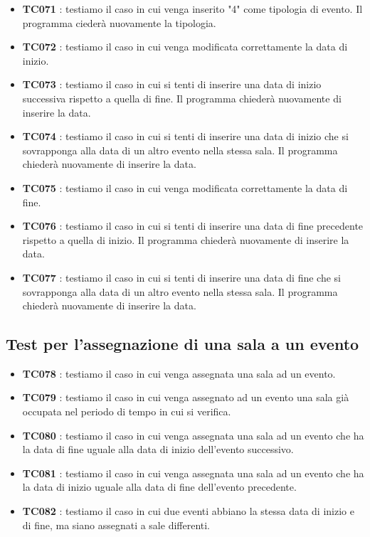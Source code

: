 \documentclass[11pt]{scrartcl} %
\begin{document}
\begin{itemize}
	\item \textbf{TC071} : testiamo il caso in cui venga inserito "4"  come tipologia di evento. Il programma ciederà nuovamente la tipologia.

	\item \textbf{TC072} : testiamo il caso in cui venga modificata correttamente la data di inizio.

	\item \textbf{TC073} : testiamo il caso in cui si tenti di inserire una data di inizio successiva rispetto a quella di fine. Il programma chiederà nuovamente di inserire la data.

	\item \textbf{TC074} : testiamo il caso in cui si tenti di inserire una data di inizio che si sovrapponga alla data di un altro evento nella stessa sala. Il programma chiederà nuovamente di inserire la data.

	\item \textbf{TC075} : testiamo il caso in cui venga modificata correttamente la data di fine.

	\item \textbf{TC076} : testiamo il caso in cui si tenti di inserire una data di fine precedente rispetto a quella di inizio. Il programma chiederà nuovamente di inserire la data.

	\item \textbf{TC077} : testiamo il caso in cui si tenti di inserire una data di fine che si sovrapponga alla data di un altro evento nella stessa sala. Il programma chiederà nuovamente di inserire la data.


\end{itemize}

\subsection{Test per l'assegnazione di una sala a un evento}

\begin{itemize}


	\item \textbf{TC078} : testiamo il caso in cui venga assegnata una sala ad un evento.

	\item \textbf{TC079} : testiamo il caso in cui venga assegnato ad un evento una sala già occupata nel periodo di tempo in cui si verifica.

	\item \textbf{TC080} : testiamo il caso in cui venga assegnata una sala ad un evento che ha la data di fine uguale alla data di inizio dell'evento successivo.

	\item \textbf{TC081} : testiamo il caso in cui venga assegnata una sala ad un evento che ha la data di inizio uguale alla data di fine dell'evento precedente.

	\item \textbf{TC082} : testiamo il caso in cui due eventi abbiano la stessa data di inizio e di fine, ma siano assegnati a sale differenti.


\end{itemize}
\end{document}
